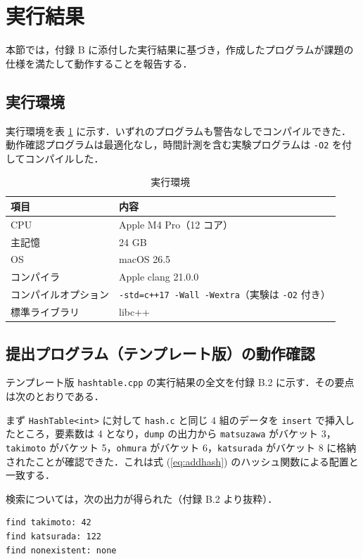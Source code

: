 \section{実行結果}

本節では，付録 B に添付した実行結果に基づき，作成したプログラムが課題の仕様を満たして動作することを報告する．

\subsection{実行環境}

実行環境を表 \ref{tab:env} に示す．いずれのプログラムも警告なしでコンパイルできた．動作確認プログラムは最適化なし，時間計測を含む実験プログラムは {\tt -O2} を付してコンパイルした．

\begin{table}[htbp]
\centering
\caption{実行環境}
\label{tab:env}
\begin{tabular}{ll}
\hline
項目 & 内容 \\
\hline
CPU & Apple M4 Pro（12 コア） \\
主記憶 & 24 GB \\
OS & macOS 26.5 \\
コンパイラ & Apple clang 21.0.0 \\
コンパイルオプション & {\tt -std=c++17 -Wall -Wextra}（実験は {\tt -O2} 付き） \\
標準ライブラリ & libc++ \\
\hline
\end{tabular}
\end{table}

\subsection{提出プログラム（テンプレート版）の動作確認}

テンプレート版 {\tt hashtable.cpp} の実行結果の全文を付録 B.2 に示す．その要点は次のとおりである．

まず {\tt HashTable<int>} に対して {\tt hash.c} と同じ 4 組のデータを {\tt insert} で挿入したところ，要素数は 4 となり，{\tt dump} の出力から
{\tt matsuzawa} がバケット 3，{\tt takimoto} がバケット 5，{\tt ohmura} がバケット 6，{\tt katsurada} がバケット 8 に格納されたことが確認できた．これは式 (\ref{eq:addhash}) のハッシュ関数による配置と一致する．

検索については，次の出力が得られた（付録 B.2 より抜粋）．

\begin{verbatim}
find takimoto: 42
find katsurada: 122
find nonexistent: none
\end{verbatim}


